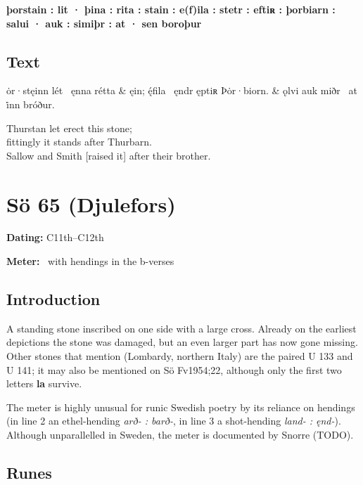 \textbf{þorstain : lit · þina : rita : stain : e(f)ila : stetr : eftiʀ : þorbiarn : salui · auk : simiþr : at · sen boroþur}

\subsection{Text}

\bvg\bva[]%
ȯr·stęinn lét \hld\ ęnna rétta &
ęin; ę́fila \hld\ ęndr ęptiʀ Þȯr·biorn. &
ǫlvi auk miðr \hld\ at i̇nn bróður. \eva

\bvb Thurstan let erect this stone; \\
fittingly it stands after Thurbarn. \\
Sallow and Smith [raised it] after their brother.\evb\evg

\sectionline\clearpage


\section{Sö 65 (Djulefors)}

\begin{flushright}%
\textbf{Dating:} C11th--C12th

\textbf{Meter:} \Fornyrdislag\ with hendings in the b-verses
\end{flushright}%

\subsection{Introduction}

A standing stone inscribed on one side with a large cross.  Already on the earliest depictions the stone was damaged, but an even larger part has now gone missing.  Other stones that mention  (Lombardy, northern Italy) are the paired U 133 and U 141; it may also be mentioned on Sö Fv1954;22, although only the first two letters \textbf{la} survive.

The meter is highly unusual for runic Swedish poetry by its reliance on hendings (in line 2 an ethel-hending \emph{arð- : barð-}, in line 3 a shot-hending \emph{land- : ęnd-}).  Although unparallelled in Sweden, the meter is documented by Snorre (TODO).

\subsection{Runes}

